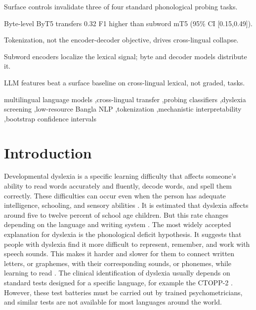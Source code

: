 \documentclass[preprint,12pt,authoryear]{elsarticle}
\begin{document}
\begin{frontmatter}
\begin{highlights}
\item Surface controls invalidate three of four standard phonological probing tasks.
\item Byte-level ByT5 transfers 0.32 F1 higher than subword mT5 (95\% CI [0.15,0.49]).
\item Tokenization, not the encoder-decoder objective, drives cross-lingual collapse.
\item Subword encoders localize the lexical signal; byte and decoder models distribute it.
\item LLM features beat a surface baseline on cross-lingual lexical, not graded, tasks.
\end{highlights}

\begin{keyword}
multilingual language models \sep cross-lingual transfer \sep probing classifiers \sep dyslexia screening \sep low-resource Bangla NLP \sep tokenization \sep mechanistic interpretability \sep bootstrap confidence intervals
\end{keyword}

\end{frontmatter}

\section{Introduction}
\label{sec:intro}
Developmental dyslexia is a specific learning difficulty that affects someone's ability to read words accurately and fluently, decode words, and spell them correctly. These difficulties can occur even when the person has adequate intelligence, schooling, and sensory abilities \citep{snowling2020dyslexia,peterson2012developmental}. It is estimated that dyslexia affects around five to twelve percent of school age children. But this rate changes depending on the language and writing system \citep{ziegler2005reading,wagner2020prevalence}. The most widely accepted explanation for dyslexia is the phonological deficit hypothesis. It suggests that people with dyslexia find it more difficult to represent, remember, and work with speech sounds.
This makes it harder and slower for them to connect written letters, or graphemes, with their corresponding sounds, or phonemes, while learning to read \citep{snowling2020dyslexia,goswami2011temporal}.
The clinical identification of dyslexia usually depends on standard tests designed for a specific language, for example the CTOPP-2 \citep{wagner2013ctopp}. However, these test batteries must be carried out by trained psychometricians, and similar tests are not available for most languages around the world.
\end{document}

